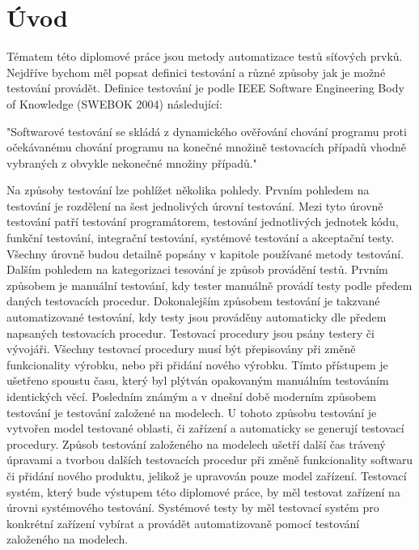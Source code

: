 \chapter{Úvod}
Tématem této diplomové práce jsou metody automatizace testů síťových prvků. Nejdříve bychom měl popsat definici testování a různé způsoby jak je možné testování provádět. Definice testování je podle IEEE Software Engineering Body of Knowledge (SWEBOK 2004) následující:

"Softwarové testování se skládá z dynamického ověřování chování programu proti očekávanému chování programu na konečné množině testovacích případů vhodně vybraných z obvykle nekonečné množiny případů."

Na způsoby testování lze pohlížet několika pohledy. Prvním pohledem na testování je rozdělení na šest jednolivých úrovní testování. Mezi tyto úrovně testování patří testování programátorem, testování jednotlivých jednotek kódu, funkční testování, integrační testování, systémové testování a akceptační testy. Všechny úrovně budou detailně popsány v kapitole používané metody testování. Dalším pohledem na kategorizaci tesování je způsob provádění testů. Prvním způsobem je manuální testování, kdy tester manuálně provádí testy podle předem daných testovacích procedur. Dokonalejším způsobem testování je takzvané automatizované testování, kdy testy jsou prováděny automaticky dle předem napsaných testovacích procedur. Testovací procedury jsou psány testery či vývojáři. Všechny testovací procedury musí být přepisovány při změně funkcionality výrobku, nebo při přidání nového výrobku. Tímto přístupem je ušetřeno spoustu času, který byl plýtván opakovaným manuálním testováním identických věcí. Posledním známým a v dnešní době moderním způsobem testování je testování založené na modelech. U tohoto způsobu testování je vytvořen model testované oblasti, či zařízení a automaticky se generují testovací procedury. Způsob testování založeného na modelech ušetří další čas trávený úpravami a tvorbou dalších testovacích procedur při změně funkcionality softwaru či přidání nového produktu, jelikož je upravován pouze model zařízení. Testovací systém, který bude výstupem této diplomové práce, by měl testovat zařízení na úrovni systémového testování. Systémové testy by měl testovací systém pro konkrétní zařízení vybírat a  provádět automatizovaně pomocí testování založeného na modelech.

